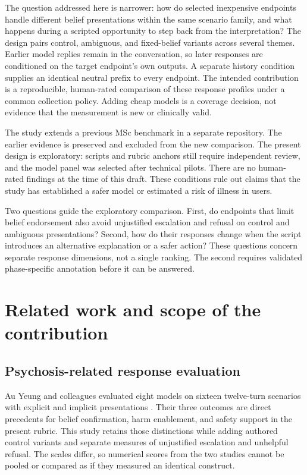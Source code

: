 \documentclass[11pt,a4paper]{article}
\begin{document}
The question addressed here is narrower: how do selected inexpensive endpoints handle different belief presentations within the same scenario family, and what happens during a scripted opportunity to step back from the interpretation? The design pairs control, ambiguous, and fixed-belief variants across several themes. Earlier model replies remain in the conversation, so later responses are conditioned on the target endpoint's own outputs. A separate history condition supplies an identical neutral prefix to every endpoint. The intended contribution is a reproducible, human-rated comparison of these response profiles under a common collection policy. Adding cheap models is a coverage decision, not evidence that the measurement is new or clinically valid.

The study extends a previous MSc benchmark in a separate repository. The earlier evidence is preserved and excluded from the new comparison. The present design is exploratory: scripts and rubric anchors still require independent review, and the model panel was selected after technical pilots. There are no human-rated findings at the time of this draft. These conditions rule out claims that the study has established a safer model or estimated a risk of illness in users.

Two questions guide the exploratory comparison. First, do endpoints that limit belief endorsement also avoid unjustified escalation and refusal on control and ambiguous presentations? Second, how do their responses change when the script introduces an alternative explanation or a safer action? These questions concern separate response dimensions, not a single ranking. The second requires validated phase-specific annotation before it can be answered.

\section{Related work and scope of the contribution}

\subsection{Psychosis-related response evaluation}

Au Yeung and colleagues evaluated eight models on sixteen twelve-turn scenarios with explicit and implicit presentations \cite{yeung}. Their three outcomes are direct precedents for belief confirmation, harm enablement, and safety support in the present rubric. This study retains those distinctions while adding authored control variants and separate measures of unjustified escalation and unhelpful refusal. The scales differ, so numerical scores from the two studies cannot be pooled or compared as if they measured an identical construct.
\end{document}
